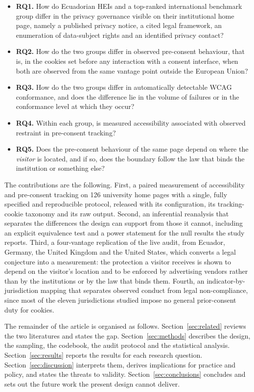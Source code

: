 \documentclass[pdflatex,sn-basic,Numbered,iicol]{sn-jnl}
\theoremstyle{thmstyleone}
\theoremstyle{thmstyletwo}
\theoremstyle{thmstylethree}
\begin{document}
	\begin{itemize}
		\item \textbf{RQ1.} How do Ecuadorian HEIs and a top-ranked international benchmark group differ in the privacy governance visible on their institutional home page, namely a published privacy notice, a cited legal framework, an enumeration of data-subject rights and an identified privacy contact?
		\item \textbf{RQ2.} How do the two groups differ in observed pre-consent behaviour, that is, in the cookies set before any interaction with a consent interface, when both are observed from the same vantage point outside the European Union?
		\item \textbf{RQ3.} How do the two groups differ in automatically detectable WCAG conformance, and does the difference lie in the volume of failures or in the conformance level at which they occur?
		\item \textbf{RQ4.} Within each group, is measured accessibility associated with observed restraint in pre-consent tracking?
		\item \textbf{RQ5.} Does the pre-consent behaviour of the same page depend on where the \emph{visitor} is located, and if so, does the boundary follow the law that binds the institution or something else?
	\end{itemize}
	
	The contributions are the following. First, a paired measurement of accessibility and pre-consent tracking on 126 university home pages with a single, fully specified and reproducible protocol, released with its configuration, its tracking-cookie taxonomy and its raw output. Second, an inferential reanalysis that separates the differences the design can support from those it cannot, including an explicit equivalence test and a power statement for the null results the study reports. Third, a four-vantage replication of the live audit, from Ecuador, Germany, the United Kingdom and the United States, which converts a legal conjecture into a measurement: the protection a visitor receives is shown to depend on the visitor's location and to be enforced by advertising vendors rather than by the institutions or by the law that binds them. Fourth, an indicator-by-jurisdiction mapping that separates observed conduct from legal non-compliance, since most of the eleven jurisdictions studied impose no general prior-consent duty for cookies.
	
	The remainder of the article is organised as follows. Section~\ref{sec:related} reviews the two literatures and states the gap. Section~\ref{sec:methods} describes the design, the sampling, the codebook, the audit protocol and the statistical analysis. Section~\ref{sec:results} reports the results for each research question. Section~\ref{sec:discussion} interprets them, derives implications for practice and policy, and states the threats to validity. Section~\ref{sec:conclusions} concludes and sets out the future work the present design cannot deliver.
	
\end{document}
